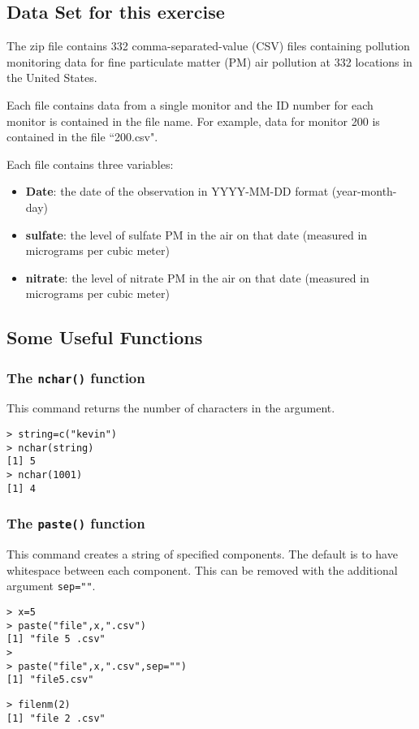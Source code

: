 \documentclass[12pt]{article}
\begin{document}
\subsection{Data Set for this exercise}
The zip file contains 332 comma-separated-value (CSV) files containing pollution monitoring data for fine particulate matter (PM) air pollution at 332 locations in the United States. 

\bigskip
\noindent Each file contains data from a single monitor and the ID number for each monitor is contained in the file name. For example, data for monitor 200 is contained in the file ``200.csv". 

\bigskip
\noindent Each file contains three variables:
\begin{itemize}
\item \textbf{Date}: the date of the observation in YYYY-MM-DD format (year-month-day)
\item \textbf{sulfate}: the level of sulfate PM in the air on that date (measured in micrograms per cubic meter)
\item \textbf{nitrate}: the level of nitrate PM in the air on that date (measured in micrograms per cubic meter)
\end{itemize}
\newpage
\subsection{Some Useful Functions}
\subsubsection{The \texttt{nchar()} function}
This command returns the number of characters in the argument.
\begin{verbatim}
> string=c("kevin")
> nchar(string)
[1] 5
> nchar(1001)
[1] 4
\end{verbatim}
\subsubsection{The \texttt{paste()} function}
This command creates a string of specified components. The default is to have whitespace between each component. This can be removed with the additional argument \texttt{sep=""}.
\begin{framed}
\begin{verbatim}
> x=5
> paste("file",x,".csv")
[1] "file 5 .csv"
>
> paste("file",x,".csv",sep="")
[1] "file5.csv"
\end{verbatim}
\end{framed}
\begin{verbatim}
> filenm(2)
[1] "file 2 .csv"
\end{verbatim}
\end{document}
